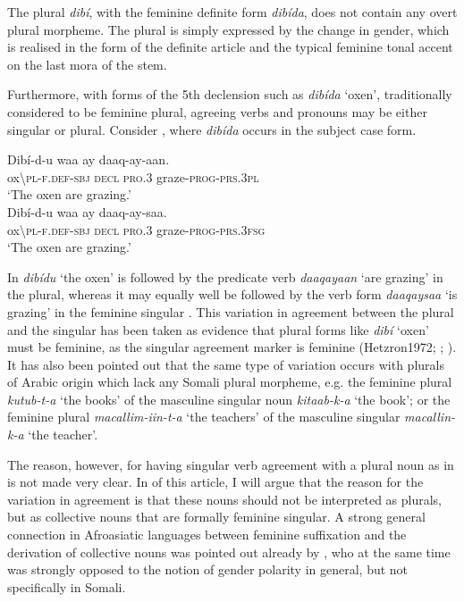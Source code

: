 \documentclass[output=paper]{langsci/langscibook}
\begin{document}
The plural \textit{dibí}, with the feminine definite form \textit{dibída}, does not contain any overt plural morpheme. The plural is simply expressed by the change in gender, which is realised in the form of the definite article and the typical feminine tonal accent on the last mora of the stem. 

Furthermore, with forms of the 5th declension such as \textit{dibída} ‘oxen’, traditionally considered to be feminine plural, agreeing verbs and pronouns may be either singular or plural. Consider , where \textit{dibída} occurs in the subject case form.

\ea
\ea
\gll  Dibí-d-u             waa  ay{\rmfnm}   daaq-ay-aan.   \\
        ox{\textbackslash}\textsc{pl-f.def-sbj}  \textsc{decl}   \textsc{pro.3}   graze-\textsc{prog-prs.3pl}\\
\glt      ‘The oxen are grazing.’\\
\ex
\gll   Dibí-d-u        waa  ay   daaq-ay-saa.\\
       ox{\textbackslash}\textsc{pl-f.def-sbj}  \textsc{decl}   \textsc{pro.3}  graze-\textsc{prog-prs.3fsg}\\
\glt   ‘The oxen are grazing.’
\z
\z


In  \textit{dibídu} ‘the oxen’ is followed by the predicate verb \textit{daaqayaan} ‘are grazing’ in the plural, whereas it may equally well be followed by the verb form \textit{daaqaysaa} ‘is grazing’ in the feminine singular . This variation in agreement between the plural and the singular has been taken as evidence that plural forms like \textit{dibí} ‘oxen’ must be feminine, as the singular agreement marker is feminine (\citealt{259--260}{Hetzron1972}; \citealt[391--393]{ZwickyPullum1983}; \citealt[134--137]{Lecarme2002}). It has also been pointed out that the same type of variation occurs with plurals of Arabic origin which lack any Somali plural morpheme, e.g. the feminine plural \textit{kutub-t-a} ‘the books’ of the masculine singular noun \textit{kitaab-k-a} ‘the book’; or the feminine plural \textit{macallim-iin-t-a} ‘the teachers’ of the masculine singular \textit{macallin-k-a} ‘the teacher’.

The reason, however, for having singular verb agreement with a plural noun as in  is not made very clear. In  of this article, I will argue that the reason for the variation in agreement is that these nouns should not be interpreted as plurals, but as collective nouns that are formally feminine singular. A strong general connection in Afroasiatic languages between feminine suffixation and the derivation of collective nouns was pointed out already by \citet{Speiser1938}, who at the same time was strongly opposed to the notion of gender polarity in general, but not specifically in Somali.
\end{document}
